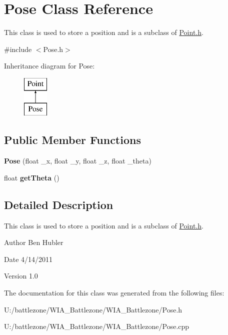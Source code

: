 \hypertarget{class_pose}{
\section{Pose Class Reference}
\label{class_pose}
}


This class is used to store a position and is a subclass of \hyperlink{_point_8h_source}{Point.h}.  




{\ttfamily \#include $<$Pose.h$>$}

Inheritance diagram for Pose:\begin{figure}[H]
\begin{center}
\leavevmode
\includegraphics[height=2.000000cm]{class_pose}
\end{center}
\end{figure}
\subsection*{Public Member Functions}
\begin{DoxyCompactItemize}
\item 
\hypertarget{class_pose_a3cd8aa60acd61ec0d1ea7cf2da0f1bc7}{
{\bfseries Pose} (float \_\-x, float \_\-y, float \_\-z, float \_\-theta)}
\label{class_pose_a3cd8aa60acd61ec0d1ea7cf2da0f1bc7}

\item 
\hypertarget{class_pose_ac68d4bed5fbbe3122451179df5dfd491}{
float {\bfseries getTheta} ()}
\label{class_pose_ac68d4bed5fbbe3122451179df5dfd491}

\end{DoxyCompactItemize}


\subsection{Detailed Description}
This class is used to store a position and is a subclass of \hyperlink{_point_8h_source}{Point.h}. 

\begin{DoxyAuthor}{Author}
Ben Hubler
\end{DoxyAuthor}
\begin{DoxyDate}{Date}
4/14/2011 
\end{DoxyDate}
\begin{DoxyVersion}{Version}
1.0 
\end{DoxyVersion}


The documentation for this class was generated from the following files:\begin{DoxyCompactItemize}
\item 
U:/battlezone/WIA\_\-Battlezone/WIA\_\-Battlezone/Pose.h\item 
U:/battlezone/WIA\_\-Battlezone/WIA\_\-Battlezone/Pose.cpp\end{DoxyCompactItemize}
